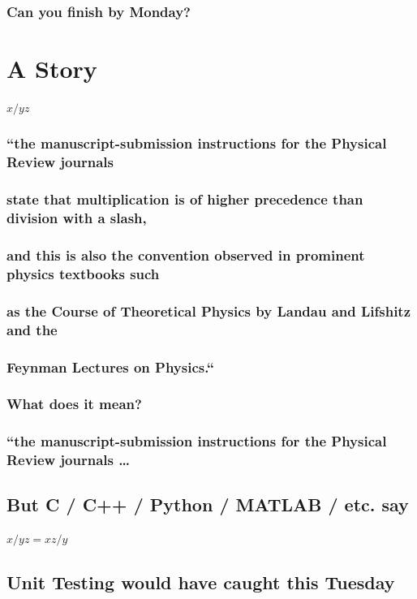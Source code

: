 \documentclass[10pt,oneside,x11names]{article}
\begin{document}
\subsubsection{Can you finish by Monday?}
\label{sec:orge021dd7}

\section{A Story}
\label{sec:orgc373ee2}
\(x/yz\)
\subsubsection{``the manuscript-submission instructions for the Physical Review journals}
\label{sec:org4b609e5}
\subsubsection{state that multiplication is of higher precedence than division with a slash,}
\label{sec:org99ebeec}
\subsubsection{and this is also the convention observed in prominent physics textbooks such}
\label{sec:org3664c2d}
\subsubsection{as the Course of Theoretical Physics by Landau and Lifshitz and the}
\label{sec:org739c784}
\subsubsection{Feynman Lectures on Physics.``}
\label{sec:orge6547c2}
\subsubsection{What does it mean?}
\label{sec:org374770c}
\subsubsection{``the manuscript-submission instructions for the Physical Review journals  \ldots{}}
\label{sec:orgfadc813}
\subsection{But C / C++ / Python / MATLAB / etc. say}
\label{sec:org6eba29f}
\(x/yz = xz/y\)
\subsection{Unit Testing would have caught this Tuesday}
\label{sec:orgc5bb799}
\end{document}
